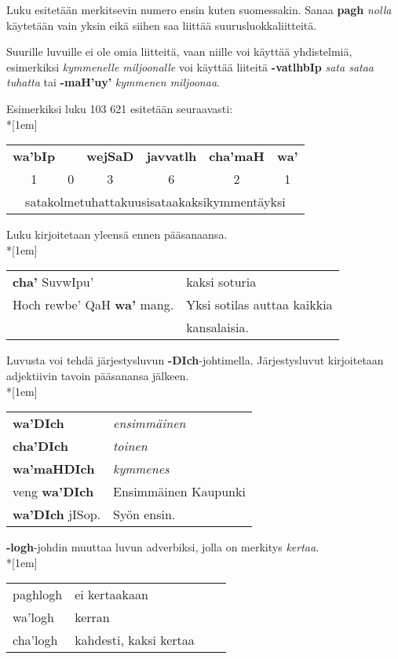 \documentclass{book}
\begin{document}
Luku esitetään merkitsevin numero ensin kuten suomessakin.
Sanaa \textbf{pagh} \textit{nolla} käytetään vain yksin eikä siihen saa liittää suurusluokkaliitteitä.

Suurille luvuille ei ole omia liitteitä, vaan niille voi käyttää yhdistelmiä, esimerkiksi \textit{kymmenelle miljoonalle} voi käyttää liiteitä \textbf{-vatlhbIp} \textit{sata sataa tuhatta} tai \textbf{-maH'uy'} \textit{kymmenen miljoonaa}.

Esimerkiksi luku 103 621 esitetään seuraavasti:\\*[1em]
\begin{tabular}{c c c c c c}
    \textbf{wa'bIp} & & \textbf{wejSaD} & \textbf{javvatlh} & \textbf{cha'maH} & \textbf{wa'} \\
    1 & 0 & 3 & 6 & 2 & 1 \\
    \multicolumn{6}{c}{satakolmetuhattakuusisataakaksikymmentäyksi} \\
\end{tabular}

Luku kirjoitetaan yleensä ennen pääsanaansa.\\*[1em]
\begin{tabular}{l l}
    \textbf{cha'} SuvwIpu' & kaksi soturia \\
    Hoch rewbe' QaH \textbf{wa'} mang. & Yksi sotilas auttaa kaikkia \\
    & kansalaisia. \\
\end{tabular}

Luvusta voi tehdä järjestysluvun \textbf{-DIch}-johtimella.
Järjestysluvut kirjoitetaan adjektiivin tavoin pääsanansa jälkeen.
\\*[1em]
\begin{tabular}{l l}
    \textbf{wa'DIch} & \textit{ensimmäinen} \\
    \textbf{cha'DIch} & \textit{toinen} \\
    \textbf{wa'maHDIch} & \textit{kymmenes} \\
    veng \textbf{wa'DIch} & Ensimmäinen Kaupunki \\
    \textbf{wa'DIch} jISop. & Syön ensin. \\
\end{tabular}

\textbf{-logh}-johdin muuttaa luvun adverbiksi, jolla on merkitys \textit{kertaa}.
\\*[1em]
\begin{tabular}{Bl Il}
    paghlogh & ei kertaakaan \\
    wa'logh & kerran \\
    cha'logh & kahdesti, kaksi kertaa \\
\end{tabular}
\end{document}
